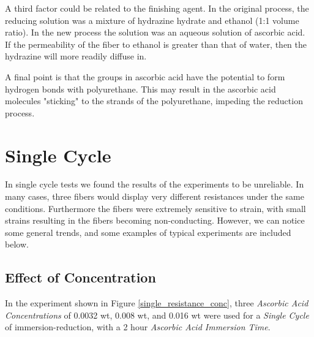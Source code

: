 \documentclass[a4paper, oneside]{discothesis}
\begin{document}
A third factor could be related to the finishing agent. In the original process, the reducing solution was a mixture of hydrazine hydrate and ethanol (1:1 volume ratio). In the new process the solution was an aqueous solution of ascorbic acid. If the permeability of the fiber to ethanol is greater than that of water, then the hydrazine will more readily diffuse in.

A final point is that the  groups in ascorbic acid have the potential to form hydrogen bonds with polyurethane. This may result in the ascorbic acid molecules "sticking" to the strands of the polyurethane, impeding the reduction process.

\section{Single Cycle}
In single cycle tests we found the results of the experiments to be unreliable. In many cases, three fibers would display very different resistances under the same conditions. Furthermore the fibers were extremely sensitive to strain, with small strains resulting in the fibers becoming non-conducting. However, we can notice some general trends, and some examples of typical experiments are included below.
\subsection{Effect of Concentration}
In the experiment shown in Figure \ref{single_resistance_conc}, three \textit{Ascorbic Acid Concentrations} of 0.0032 wt, 0.008 wt, and 0.016 wt were used for a \textit{Single Cycle} of immersion-reduction, with a 2 hour \textit{Ascorbic Acid Immersion Time}.
\end{document}
